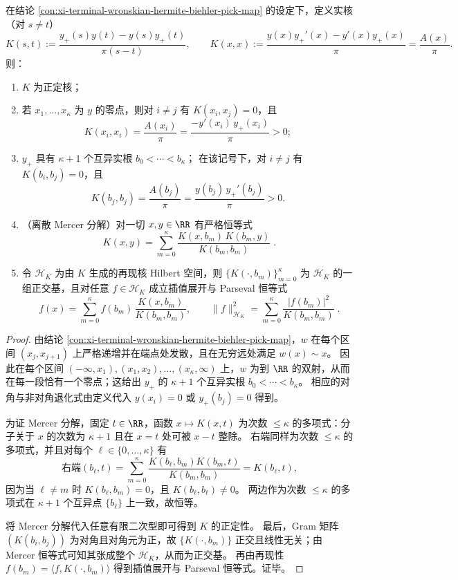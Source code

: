 \begin{conclusion}\label{con:xi-terminal-wronskian-kernel-discrete-mercer-parseval}
在结论 \ref{con:xi-terminal-wronskian-hermite-biehler-pick-map} 的设定下，定义实核（对 \(s\neq t\)）
\[
K(s,t):=\frac{y_{+}(s)y(t)-y(s)y_{+}(t)}{\pi(s-t)},\qquad
K(x,x):=\frac{y(x)y_{+}'(x)-y'(x)y_{+}(x)}{\pi}=\frac{A(x)}{\pi}.
\]
则：
\begin{enumerate}
  \item \(K\) 为正定核；
  \item 若 \(x_1,\dots,x_{\kappa}\) 为 \(y\) 的零点，则对 \(i\neq j\) 有 \(K(x_i,x_j)=0\)，且
  \[
  K(x_i,x_i)=\frac{A(x_i)}{\pi}=\frac{-y'(x_i)\,y_{+}(x_i)}{\pi}>0;
  \]
  \item \(y_{+}\) 具有 \(\kappa+1\) 个互异实根 \(b_0<\cdots<b_{\kappa}\)；
  在该记号下，对 \(i\neq j\) 有 \(K(b_i,b_j)=0\)，且
  \[
  K(b_j,b_j)=\frac{A(b_j)}{\pi}=\frac{y(b_j)\,y_{+}'(b_j)}{\pi}>0.
  \]
  \item （离散 Mercer 分解）对一切 \(x,y\in\RR\) 有严格恒等式
  \[
  \boxed{\;
  K(x,y)=\sum_{m=0}^{\kappa}\frac{K(x,b_m)\,K(b_m,y)}{K(b_m,b_m)}\; }.
  \]
  \item 令 \(\mathcal{H}_K\) 为由 \(K\) 生成的再现核 Hilbert 空间，则
  \(\{K(\cdot,b_m)\}_{m=0}^{\kappa}\) 为 \(\mathcal{H}_K\) 的一组正交基，且对任意 \(f\in\mathcal{H}_K\) 成立插值展开与 Parseval 恒等式
  \[
  \boxed{\;
  f(x)=\sum_{m=0}^{\kappa} f(b_m)\,\frac{K(x,b_m)}{K(b_m,b_m)},
  \qquad
  \|f\|_{\mathcal{H}_K}^{2}=\sum_{m=0}^{\kappa}\frac{|f(b_m)|^{2}}{K(b_m,b_m)}\; }.
  \]
\end{enumerate}
\end{conclusion}
\begin{proof}
由结论 \ref{con:xi-terminal-wronskian-hermite-biehler-pick-map}，\(w\) 在每个区间 \((x_j,x_{j+1})\) 上严格递增并在端点处发散，且在无穷远处满足 \(w(x)\sim x\)。
因此在每个区间 \((-\infty,x_1),(x_1,x_2),\dots,(x_\kappa,\infty)\) 上，\(w\) 为到 \(\RR\) 的双射，从而在每一段恰有一个零点；这给出 \(y_{+}\) 的 \(\kappa+1\) 个互异实根 \(b_0<\cdots<b_\kappa\)。
相应的对角与非对角退化式由定义代入 \(y(x_i)=0\) 或 \(y_{+}(b_j)=0\) 得到。
\par
为证 Mercer 分解，固定 \(t\in\RR\)，函数 \(x\mapsto K(x,t)\) 为次数 \(\le \kappa\) 的多项式：分子关于 \(x\) 的次数为 \(\kappa+1\) 且在 \(x=t\) 处可被 \(x-t\) 整除。
右端同样为次数 \(\le \kappa\) 的多项式，并且对每个 \(\ell\in\{0,\dots,\kappa\}\) 有
\[
\text{右端}(b_\ell,t)=\sum_{m=0}^{\kappa}\frac{K(b_\ell,b_m)K(b_m,t)}{K(b_m,b_m)}=K(b_\ell,t),
\]
因为当 \(\ell\neq m\) 时 \(K(b_\ell,b_m)=0\)，且 \(K(b_\ell,b_\ell)\neq 0\)。
两边作为次数 \(\le\kappa\) 的多项式在 \(\kappa+1\) 个互异点 \(\{b_\ell\}\) 上一致，故恒等。
\par
将 Mercer 分解代入任意有限二次型即可得到 \(K\) 的正定性。
最后，Gram 矩阵 \((K(b_i,b_j))\) 为对角且对角元为正，故 \(\{K(\cdot,b_m)\}\) 正交且线性无关；由 Mercer 恒等式可知其张成整个 \(\mathcal{H}_K\)，从而为正交基。
再由再现性 \(f(b_m)=\langle f,K(\cdot,b_m)\rangle\) 得到插值展开与 Parseval 恒等式。证毕。
\end{proof}

